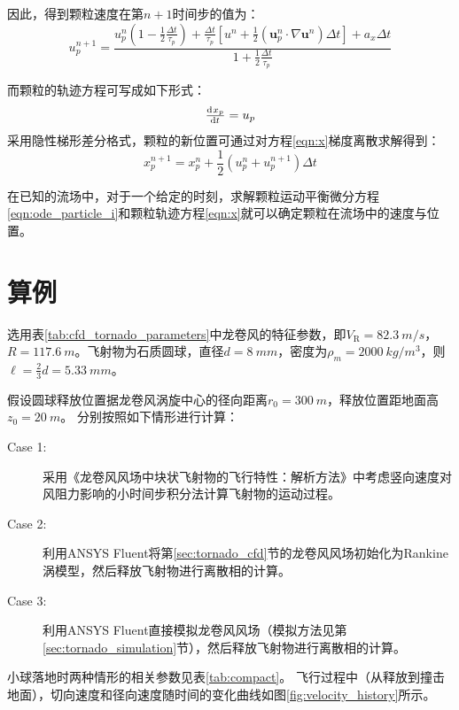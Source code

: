 \documentclass{ctexart}
\begin{document}
因此，得到颗粒速度在第$n+1$时间步的值为：
\begin{equation}
u_{p}^{n+1}=\frac{u_{p}^{n}\left(   1- \frac{1}{2}\frac{\Delta t}{\tau_p} \right)+\frac{\Delta t}{\tau_p}\left[    u^n + \frac{1}{2} \left( \bm{u}_p^n\cdot \nabla \bm{u}^n \right) \Delta t    \right]+a_x \Delta t}{1+\frac{1}{2}\frac{\Delta t}{\tau_p}}
\end{equation}

而颗粒的轨迹方程可写成如下形式：
\begin{equation}\label{eqn:x}
\od{x_p}{t} = u_p
\end{equation}
采用隐性梯形差分格式，颗粒的新位置可通过对方程\eqref{eqn:x}梯度离散求解得到：
\begin{equation}
x_p^{n+1} = x_{p}^{n} + \frac{1}{2} \left( u_p^{n}+u_{p}^{n+1}\right) \Delta t 
\end{equation}

在已知的流场中，对于一个给定的时刻，求解颗粒运动平衡微分方程\eqref{eqn:ode_particle_i}和颗粒轨迹方程\eqref{eqn:x}就可以确定颗粒在流场中的速度与位置。

\section{算例}
选用表\ref{tab:cfd_tornado_parameters}中龙卷风的特征参数，即$V_{\mathrm{R}}=\SI{82.3}{m/s}$，$R = \SI{117.6}{m}$。飞射物为石质圆球，直径$d=\SI{8}{mm}$，密度为$\rho_m=\SI{2000}{kg/m^3}$，则$\ell =\frac{2}{3}d=\SI{5.33}{mm}$。

假设圆球释放位置据龙卷风涡旋中心的径向距离$r_0=\SI{300}{m}$，释放位置距地面高$z_0=\SI{20}{m}$。
分别按照如下情形进行计算：
\begin{description}
\item[Case 1: ] 采用《龙卷风风场中块状飞射物的飞行特性：解析方法》中考虑竖向速度对风阻力影响的小时间步积分法计算飞射物的运动过程。
\item[Case 2: ] 
利用ANSYS Fluent\textregistered 将第\ref{sec:tornado_cfd}节的龙卷风风场初始化为Rankine涡模型，然后释放飞射物进行离散相的计算。
\item[Case 3: ] 
利用ANSYS Fluent\textregistered 直接模拟龙卷风风场（模拟方法见第\ref{sec:tornado_simulation}节），然后释放飞射物进行离散相的计算。
\end{description}

小球落地时两种情形的相关参数见表\ref{tab:compact}。
飞行过程中（从释放到撞击地面），切向速度和径向速度随时间的变化曲线如图\ref{fig:velocity_history}所示。
\end{document}

